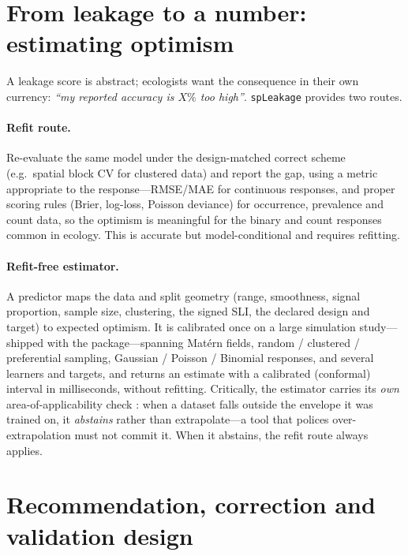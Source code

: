 \documentclass[11pt,a4paper]{article}
\begin{document}
\section{From leakage to a number: estimating optimism}\label{sec:optimism}

A leakage score is abstract; ecologists want the consequence in their own currency:
\emph{``my reported accuracy is $X\%$ too high''}. \texttt{spLeakage} provides two
routes.

\paragraph{Refit route.} Re-evaluate the same model under the design-matched correct
scheme (e.g.\ spatial block CV for clustered data) and report the gap, using a metric
appropriate to the response---RMSE/MAE for continuous responses, and proper scoring
rules (Brier, log-loss, Poisson deviance) for occurrence, prevalence and count data,
so the optimism is meaningful for the binary and count responses common in ecology.
This is accurate but model-conditional and requires refitting.

\paragraph{Refit-free estimator.} A predictor maps the data and split geometry (range,
smoothness, signal proportion, sample size, clustering, the signed SLI, the declared
design and target) to expected optimism. It is calibrated once on a large simulation
study---shipped with the package---spanning Mat\'ern fields, random / clustered /
preferential sampling, Gaussian / Poisson / Binomial responses, and several learners
and targets, and returns an estimate with a calibrated (conformal) interval in
milliseconds, without refitting. Critically, the estimator carries its \emph{own}
area-of-applicability check \citep{meyer2021aoa}: when a dataset falls outside the
envelope it was trained on, it \emph{abstains} rather than extrapolate---a tool that
polices over-extrapolation must not commit it. When it abstains, the refit route
always applies.

\section{Recommendation, correction and validation design}\label{sec:recommend}
\end{document}
